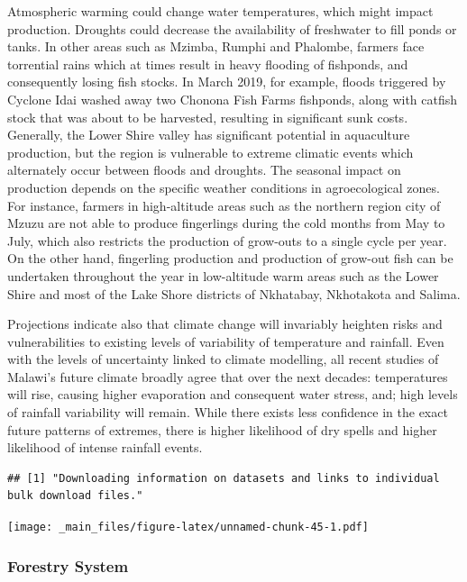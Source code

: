 \documentclass[
]{book}
\begin{document}
Atmospheric warming could change water temperatures, which might impact production. Droughts could decrease the availability of freshwater to fill ponds or tanks. In other areas such as Mzimba, Rumphi and Phalombe, farmers face torrential rains which at times result in heavy flooding of fishponds, and consequently losing fish stocks. In March 2019, for example, floods triggered by Cyclone Idai washed away two Chonona Fish Farms fishponds, along with catfish stock that was about to be harvested, resulting in significant sunk costs. Generally, the Lower Shire valley has significant potential in aquaculture production, but the region is vulnerable to extreme climatic events which alternately occur between floods and droughts. The seasonal impact on production depends on the specific weather conditions in agroecological zones. For instance, farmers in high-altitude areas such as the northern region city of Mzuzu are not able to produce fingerlings during the cold months from May to July, which also restricts the production of grow-outs to a single cycle per year. On the other hand, fingerling production and production of grow-out fish can be undertaken throughout the year in low-altitude warm areas such as the Lower Shire and most of the Lake Shore districts of Nkhatabay, Nkhotakota and Salima.

Projections indicate also that climate change will invariably heighten risks and vulnerabilities to existing levels of variability of temperature and rainfall. Even with the levels of uncertainty linked to climate modelling, all recent studies of Malawi's future climate broadly agree that over the next decades: temperatures will rise, causing higher evaporation and consequent water stress, and; high levels of rainfall variability will remain. While there exists less confidence in the exact future patterns of extremes, there is higher likelihood of dry spells and higher likelihood of intense rainfall events.

\begin{verbatim}
## [1] "Downloading information on datasets and links to individual bulk download files."
\end{verbatim}

\texttt{[image: \_main\_files/figure-latex/unnamed-chunk-45-1.pdf]}

\hypertarget{forestry-system}{%
\subsubsection{Forestry System}\label{forestry-system}}
\end{document}
